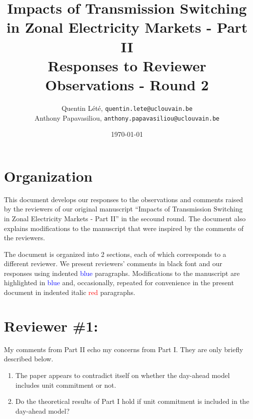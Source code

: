 \documentclass[a4paper,11pt]{article}
\title{Impacts of Transmission Switching in Zonal Electricity Markets - Part II \\[.25cm]
	\Large{Responses to Reviewer Observations - Round 2}}
\author{Quentin Lété, \texttt{quentin.lete@uclouvain.be} \\
	Anthony Papavasiliou, \texttt{anthony.papavasiliou@uclouvain.be}}
\date{\today}
\begin{document}
\maketitle

\section*{Organization}

This document develops our responses to the observations and comments raised by the reviewers of our original manuscript ``Impacts of Transmission Switching in Zonal Electricity Markets - Part II'' in the secound round. The document also explains modifications to the manuscript that were inspired by the comments of the reviewers.

The document is organized into 2 sections, each of which corresponds to a different reviewer. We present reviewers' comments in black font and our responses using indented \textcolor{blue}{blue} paragraphs. Modifications to the manuscript are highlighted in \textcolor{blue}{blue} and, occasionally, repeated for convenience in the present document in indented italic \textcolor{red}{red} paragraphs.

\section{Reviewer \#1:}
My comments from Part II echo my concerns from Part I. They are only briefly described below.


\begin{enumerate}
    \item The paper appears to contradict itself on whether the day-ahead model includes unit commitment or not.
    \item Do the theoretical results of Part I hold if unit commitment is included in the day-ahead model?
\end{enumerate}

\end{document}
